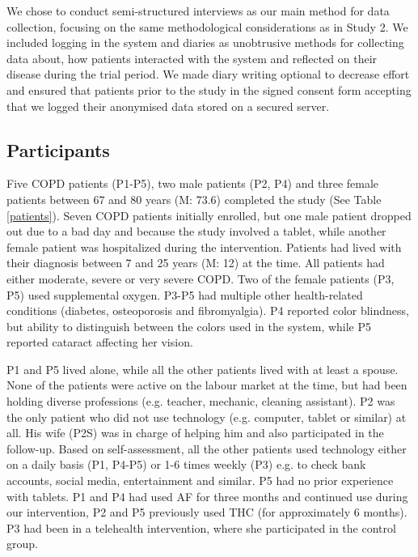 We chose to conduct semi-structured interviews as our main method for data collection, focusing on the same methodological considerations as in Study 2. We included logging in the system and diaries as unobtrusive methods for collecting data about, how patients interacted with the system and reflected on their disease during the trial period. We made diary writing optional to decrease effort and ensured that patients prior to the study in the signed consent form accepting that we logged their anonymised data stored on a secured server. 

\subsection{Participants}
Five COPD patients (P1-P5), two male patients (P2, P4) and three female patients between 67 and 80 years (M: 73.6) completed the study (See Table \ref{patients}). Seven COPD patients initially enrolled, but one male patient dropped out due to a bad day and because the study involved a tablet, while another female patient was hospitalized during the intervention. Patients had lived with their diagnosis between 7 and 25 years (M: 12) at the time. All patients had either moderate, severe or very severe COPD. Two of the female patients (P3, P5) used supplemental oxygen. P3-P5 had multiple other health-related conditions (diabetes, osteoporosis and fibromyalgia). P4 reported color blindness, but ability to distinguish between the colors used in the system, while P5 reported cataract affecting her vision. 

P1 and P5 lived alone, while all the other patients lived with at least a spouse. None of the patients were active on the labour market at the time, but had been holding diverse professions (e.g. teacher, mechanic, cleaning assistant). P2 was the only patient who did not use technology (e.g. computer, tablet or similar) at all. His wife (P2S) was in charge of helping him and also participated in the follow-up. Based on self-assessment, all the other patients used technology either on a daily basis (P1, P4-P5) or 1-6 times weekly (P3) e.g. to check bank accounts, social media, entertainment and similar. P5 had no prior experience with tablets. P1 and P4 had used AF for three months and continued use during our intervention, P2 and P5 previously used THC (for approximately 6 months). P3 had been in a telehealth intervention, where she participated in the control group.  

